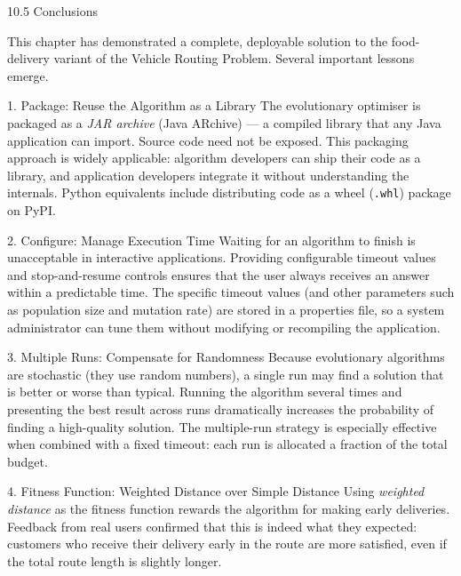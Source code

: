 \documentclass[aspectratio=169,10pt]{beamer}
\begin{document}
\begin{frame}[allowframebreaks]{10.5 Conclusions}

  This chapter has demonstrated a complete, deployable solution to the
  food-delivery variant of the Vehicle Routing Problem.  Several
  important lessons emerge.

  \begin{block}{1. Package: Reuse the Algorithm as a Library}
    The evolutionary optimiser is packaged as a \emph{JAR archive}
    (Java ARchive) — a compiled library that any Java application can
    import.  Source code need not be exposed.  This packaging approach
    is widely applicable: algorithm developers can ship their code as
    a library, and application developers integrate it without
    understanding the internals.  Python equivalents include
    distributing code as a wheel (\texttt{.whl}) package on PyPI.
  \end{block}

  \begin{block}{2. Configure: Manage Execution Time}
    Waiting for an algorithm to finish is unacceptable in interactive
    applications.  Providing configurable timeout values and
    stop-and-resume controls ensures that the user always receives
    an answer within a predictable time.  The specific timeout values
    (and other parameters such as population size and mutation rate)
    are stored in a properties file, so a system administrator can tune
    them without modifying or recompiling the application.
  \end{block}

  \begin{block}{3. Multiple Runs: Compensate for Randomness}
    Because evolutionary algorithms are stochastic (they use random
    numbers), a single run may find a solution that is better or worse
    than typical.  Running the algorithm several times and presenting
    the best result across runs dramatically increases the probability
    of finding a high-quality solution.  The multiple-run strategy is
    especially effective when combined with a fixed timeout: each
    run is allocated a fraction of the total budget.
  \end{block}

  \begin{block}{4. Fitness Function: Weighted Distance over Simple Distance}
    Using \emph{weighted distance} as the fitness function rewards
    the algorithm for making early deliveries.  Feedback from real
    users confirmed that this is indeed what they expected: customers
    who receive their delivery early in the route are more satisfied,
    even if the total route length is slightly longer.
  \end{block}


\end{frame}
\end{document}
